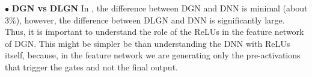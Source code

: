 $\bullet$ \textbf{DGN vs DLGN} In , the difference between DGN and DNN is minimal (about $3\%$), however, the difference between DLGN and DNN is significantly large. Thus, it is important to understand the role of the ReLUs in the feature network of DGN. This might be simpler be than understanding the DNN with ReLUs itself, because, in the feature network we are generating only the pre-activations that trigger the gates and not the final output. %









 


